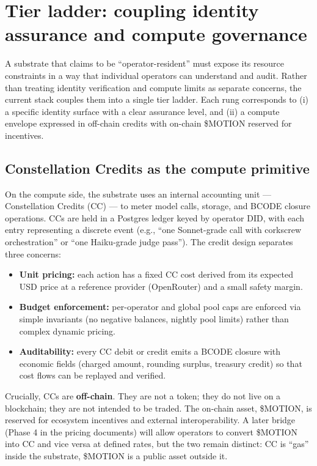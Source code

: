 \section{Tier ladder: coupling identity assurance and compute
governance}\label{tier-ladder-coupling-identity-assurance-and-compute-governance}

A substrate that claims to be ``operator-resident'' must expose its
resource constraints in a way that individual operators can understand
and audit. Rather than treating identity verification and compute limits
as separate concerns, the current stack couples them into a single tier
ladder. Each rung corresponds to (i) a specific identity surface with a
clear assurance level, and (ii) a compute envelope expressed in
off-chain credits with on-chain \$MOTION reserved for incentives.

\subsection{Constellation Credits as the compute
primitive}\label{constellation-credits-as-the-compute-primitive}

On the compute side, the substrate uses an internal accounting unit ---
Constellation Credits (CC) --- to meter model calls, storage, and BCODE
closure operations. CCs are held in a Postgres ledger keyed by operator
DID, with each entry representing a discrete event (e.g., ``one
Sonnet-grade call with corkscrew orchestration'' or ``one Haiku-grade
judge pass''). The credit design separates three concerns:

\begin{itemize}
\tightlist
\item
  \textbf{Unit pricing:} each action has a fixed CC cost derived from
  its expected USD price at a reference provider (OpenRouter) and a
  small safety margin.
\item
  \textbf{Budget enforcement:} per-operator and global pool caps are
  enforced via simple invariants (no negative balances, nightly pool
  limits) rather than complex dynamic pricing.
\item
  \textbf{Auditability:} every CC debit or credit emits a BCODE closure
  with economic fields (charged amount, rounding surplus, treasury
  credit) so that cost flows can be replayed and verified.
\end{itemize}

Crucially, CCs are \textbf{off-chain}. They are not a token; they do not
live on a blockchain; they are not intended to be traded. The on-chain
asset, \$MOTION, is reserved for ecosystem incentives and external
interoperability. A later bridge (Phase 4 in the pricing documents) will
allow operators to convert \$MOTION into CC and vice versa at defined
rates, but the two remain distinct: CC is ``gas'' inside the substrate,
\$MOTION is a public asset outside it.

